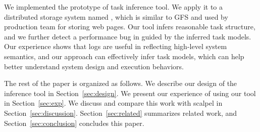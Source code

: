 We implemented the prototype of task inference tool.
We apply it to a distributed storage system
named \cosmos, which is similar to GFS and used by production
team for storing web pages. Our tool infers reasonable
task structure, and we further detect a performance
bug in \cosmos guided by the inferred task models.
Our experience shows that logs are useful in reflecting
high-level system semantics, and our approach can effectively
infer task models, which can help better understand system
design and execution behaviors.

The rest of the paper is organized as follows. We describe
our design of the inference tool in
Section~\ref{sec:design}.  We present our experience of
using our tool in Section~\ref{sec:exp}.  We discuss and
compare this work with scalpel in
Section~\ref{sec:discussion}.
Section~\ref{sec:related} summarizes related work, and
Section~\ref{sec:conclusion} concludes this paper.











